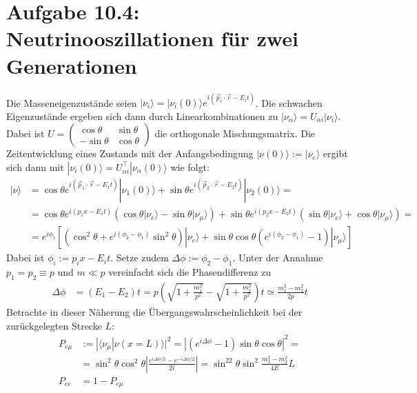 \documentclass[a4paper,12pt]{article}
\newcommand{\brak}{}
\newcommand{\kla}{}
\newcommand{\klam}{}
\newcommand{\Ket}{}
\begin{document}
\section*{Aufgabe 10.4: Neutrinooszillationen für zwei Generationen}
Die Masseneigenzustände seien $\Ket | {\nu_i} \rangle=\Ket | {\nu_i(0)} \rangle e^{i(\vec{p}_i\cdot\vec{r}-E_it)}$. Die schwachen Eigenzustände ergeben sich dann durch Linearkombinationen zu $\Ket | {\nu_\alpha} \rangle=U_{\alpha i}\Ket | {\nu_i} \rangle$. Dabei ist $U=\begin{pmatrix}
\cos\theta &\sin\theta \\ -\sin\theta &\cos\theta
\end{pmatrix} $ die orthogonale Mischungsmatrix. Die Zeitentwicklung eines Zustands mit der Anfangsbedingung $\Ket | {\nu(0)} \rangle:=\Ket | {\nu_e} \rangle$ ergibt sich dann mit $\Ket | {\nu_i(0)} \rangle=U_{\alpha i}^\top\Ket | {\nu_\alpha(0)} \rangle$ wie folgt:
\begin{align*}
\Ket | {\nu} \rangle&=\cos\theta e^{i(\vec{p}_1\cdot\vec{r}-E_1t)}\Ket | {\nu_1(0)} \rangle+ \sin\theta e^{i(\vec{p}_2\cdot\vec{r}-E_2t)}\Ket | {\nu_2(0)} \rangle=\\
&=\cos\theta e^{i(p_1x-E_1t)}\kla\left( {\cos\theta\Ket | {\nu_e} \rangle-\sin\theta\Ket | {\nu_\mu } \rangle} \right)+ \sin\theta e^{i(p_2x-E_2t)}\kla\left( {\sin\theta\Ket | {\nu_e} \rangle+\cos\theta\Ket | {\nu_\mu } \rangle} \right)=\\
&=e^{i\phi_1}\klam\left[ {\kla\left( {\cos^2\theta + e^{i(\phi_2-\phi_1)}\sin^2\theta} \right)\Ket | {\nu_e} \rangle+\sin\theta\cos\theta\kla\left( {e^{i(\phi_2-\phi_1)}-1} \right)\Ket | {\nu_\mu } \rangle} \right]
\end{align*}
Dabei ist $\phi_i:=p_ix-E_it$. Setze zudem $\Delta\phi:=\phi_2-\phi_1$. Unter der Annahme $p_1=p_2\equiv p$ und $m\ll p$ vereinfacht sich die Phasendifferenz zu
\begin{align*}
\Delta\phi &=(E_1-E_2)t=p\kla\left( {\sqrt{1+\frac{m_1^2}{p^2}}-\sqrt{1+\frac{m_2^2}{p^2}}} \right)t \simeq \frac{m_1^2-m_2^2}{2p}t
\end{align*}
Betrachte in dieser Näherung die Übergangswahrscheinlichkeit bei der zurückgelegten Strecke $L$:
\begin{align*}
P_{e\mu}&:=|\brak\langle {\nu_\mu}| {\nu(x=L)}\rangle|^2=\left\vert\kla\left( {e^{i\Delta\phi}-1} \right)\sin\theta\cos\theta\right\vert^2=\\
&=\sin^2\theta\cos^2\theta\left\vert\frac{e^{i\Delta\phi/2}-e^{-i\Delta\phi/2}}{2i}\right\vert=\sin^22\theta\sin^2\frac{m_1^2-m_2^2}{4E}L\\
P_{ee}&=1-P_{e\mu}
\end{align*}
\end{document}
